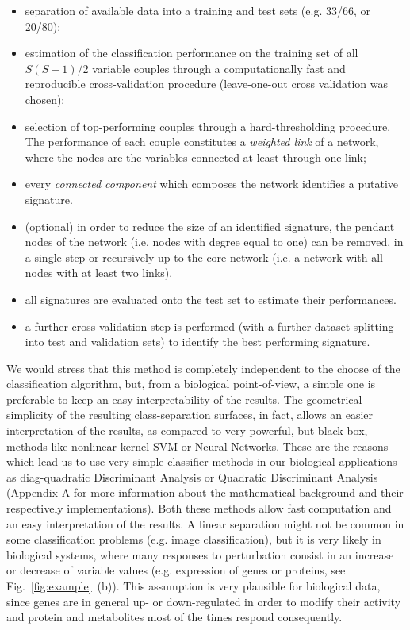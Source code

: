 \documentclass{standalone}
\begin{document}
\begin{itemize}

\item separation of available data into a training and test sets (e.g. 33/66, or 20/80);

\item estimation of the classification performance on the training set of all $S(S-1)/2$ variable couples through a computationally fast and reproducible cross-validation procedure (leave-one-out cross validation was chosen);

\item selection of top-performing couples through a hard-thresholding procedure.
The performance of each couple constitutes a \emph{weighted link} of a network, where the nodes are the variables connected at least through one link;

\item every \emph{connected component} which composes the network identifies a putative signature.

\item (optional) in order to reduce the size of an identified signature, the pendant nodes of the network (i.e. nodes with degree equal to one) can be removed, in a single step or recursively up to the core network (i.e. a network with all nodes with at least two links).

\item all signatures are evaluated onto the test set to estimate their performances.

\item a further cross validation step is performed (with a further dataset splitting into test and validation sets) to identify the best performing signature.

\end{itemize}

We would stress that this method is completely independent to the choose of the classification algorithm, but, from a biological point-of-view, a simple one is preferable to keep an easy interpretability of the results.
The geometrical simplicity of the resulting class-separation surfaces, in fact, allows an easier interpretation of the results, as compared to very powerful, but black-box, methods like nonlinear-kernel SVM or Neural Networks.
These are the reasons which lead us to use very simple classifier methods in our biological applications as diag-quadratic Discriminant Analysis or Quadratic Discriminant Analysis (Appendix A for more information about the mathematical background and their respectively implementations).
Both these methods allow fast computation and an easy interpretation of the results.
A linear separation might not be common in some classification problems (e.g. image classification), but it is very likely in biological systems, where many responses to perturbation consist in an increase or decrease of variable values (e.g. expression of genes or proteins, see Fig.~\ref{fig:example}~(b)).
This assumption is very plausible for biological data, since genes are in general up- or down-regulated in order to modify their activity and protein and metabolites most of the times respond consequently.
\end{document}
